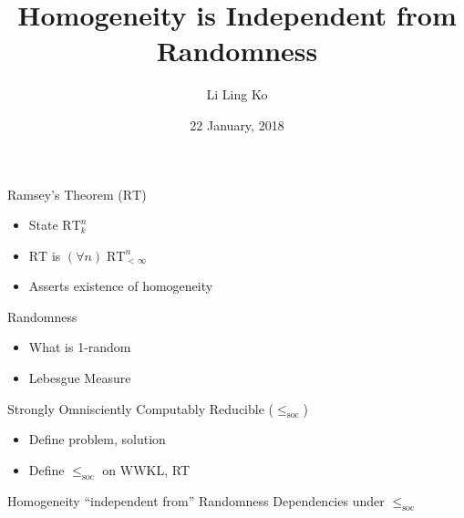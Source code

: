 \documentclass[notes]{beamer}
\title{Homogeneity is Independent from Randomness}
\author{Li Ling Ko}
\institute{University of Notre Dame}
\date{22 January, 2018}
\begin{document}
\begin{frame}
  \titlepage
\end{frame}

\begin{frame}{Ramsey's Theorem ($\text{RT}$)}
  \begin{itemize}
    \item State $\text{RT}_k^n$
    \item $\text{RT}$ is $(\forall n)\; \text{RT}_{<\infty}^n$
  \end{itemize}

  \begin{itemize}
    \item Asserts existence of homogeneity
  \end{itemize}
\end{frame}

\begin{frame}{Randomness}
  \begin{itemize}
    \item What is 1-random
    \item Lebesgue Measure
  \end{itemize}
\end{frame}

\begin{frame}{Strongly Omnisciently Computably Reducible
  ($\leq_{\text{soc}}$)}
  \begin{itemize}
    \item Define problem, solution
    \item Define $\leq_{\text{soc}}$ on WWKL, RT
  \end{itemize}
\end{frame}


\begin{frame}{Homogeneity ``independent from'' Randomness}
  Dependencies under $\leq_{\text{soc}}$
  \vspace{2em}

  \begin{center}
  \end{center}
\end{frame}
\end{document}
